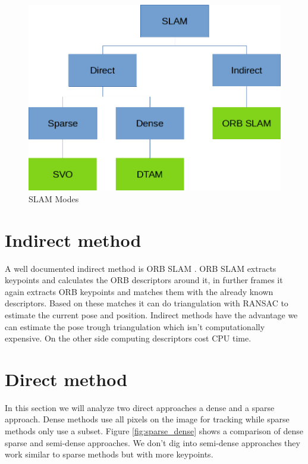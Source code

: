 \documentclass[11pt,a4paper,titlepage,oneside]{report}
\begin{document}
\begin{figure}[H]
	\includegraphics[width=1.0\textwidth]{img/slam_modes.png}
	\caption{SLAM Modes}\label{fig:slammodes}
\end{figure}


\section{Indirect method}

A well documented indirect method is ORB SLAM \cite{orbslam}. ORB SLAM extracts keypoints and calculates the ORB descriptors \cite{orb} around it, in further frames it again extracts ORB keypoints and matches them with the already known descriptors. Based on these matches it can do triangulation with RANSAC \cite{ransac} to estimate the current pose and position. Indirect methods have the advantage we can estimate the pose trough triangulation which isn’t computationally expensive. On the other side computing descriptors cost CPU time.

\section{Direct method}

In this section we will analyze two direct approaches a dense and a sparse approach. Dense methods use all pixels on the image for tracking while sparse methods only use a subset. Figure \ref{fig:sparse_dense} shows a comparison of dense sparse and semi-dense approaches. We don't dig into semi-dense approaches they work similar to sparse methods but with more keypoints.
\end{document}
